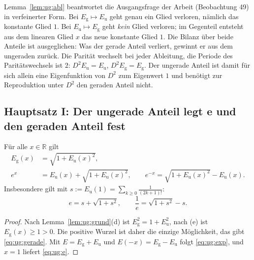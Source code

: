 \begin{bemerkung}\label{bem:ug:bilanz}
Lemma~\ref{lem:ug:abl} beantwortet die Ausgangsfrage der Arbeit (Beobachtung 49) in verfeinerter Form. Bei $E_{\mathrm g}\mapsto E_{\mathrm u}$ geht genau ein Glied verloren, nämlich das konstante Glied $1$. Bei $E_{\mathrm u}\mapsto E_{\mathrm g}$ geht \emph{kein} Glied verloren; im Gegenteil entsteht aus dem linearen Glied $x$ das neue konstante Glied $1$. Die Bilanz über beide Anteile ist ausgeglichen: Was der gerade Anteil verliert, gewinnt er aus dem ungeraden zurück. Die Parität wechselt bei jeder Ableitung, die Periode des Paritätswechsels ist $2$: $D^2E_{\mathrm u}=E_{\mathrm u}$, $D^2E_{\mathrm g}=E_{\mathrm g}$. Der ungerade Anteil ist damit für sich allein eine Eigenfunktion von $D^2$ zum Eigenwert $1$ und benötigt zur Reproduktion unter $D^2$ den geraden Anteil nicht.
\end{bemerkung}

\subsection{Hauptsatz I: Der ungerade Anteil legt e und den geraden Anteil fest}
\label{sec:ug:haupt1}

\begin{satz}\label{satz:ug:rekon}
Für alle $x\in\mathbb{R}$ gilt
\begin{align}
E_{\mathrm g}(x)&=\sqrt{1+E_{\mathrm u}(x)^2}, \label{eq:ug:gerade}\\
e^{x}&=E_{\mathrm u}(x)+\sqrt{1+E_{\mathrm u}(x)^2}, \qquad e^{-x}=\sqrt{1+E_{\mathrm u}(x)^2}-E_{\mathrm u}(x). \label{eq:ug:exp}
\end{align}
Insbesondere gilt mit $s:=E_{\mathrm u}(1)=\sum_{k\ge0}\frac1{(2k+1)!}$:
\begin{equation}\label{eq:ug:e}
e=s+\sqrt{1+s^2},\qquad \frac1e=\sqrt{1+s^2}-s .
\end{equation}
\end{satz}

\begin{proof}
Nach Lemma~\ref{lem:ug:grund}(d) ist $E_{\mathrm g}^2=1+E_{\mathrm u}^2$, nach (e) ist $E_{\mathrm g}(x)\ge1>0$. Die positive Wurzel ist daher die einzige Möglichkeit, das gibt \eqref{eq:ug:gerade}. Mit $E=E_{\mathrm g}+E_{\mathrm u}$ und $E(-x)=E_{\mathrm g}-E_{\mathrm u}$ folgt \eqref{eq:ug:exp}, und $x=1$ liefert \eqref{eq:ug:e}.
\end{proof}

